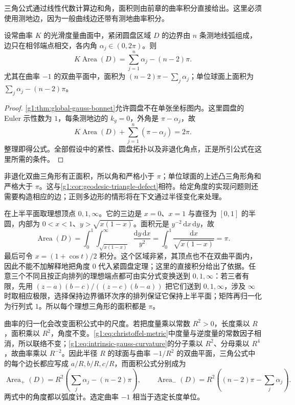 三角公式通过线性代数计算边和角，面积则由前章的曲率积分直接给出。这里必须使用测地边，因为一般曲线边还带有测地曲率积分。

\begin{proposition}
	\label{g1:prop:geodesic-polygon-area}
	设常曲率 \(K\) 的光滑度量曲面中，紧闭圆盘区域 \(D\) 的边界由 \(n\) 条测地线弧组成，边只在相邻端点相交，各内角 \(\alpha_j\in(0,2\pi)\)。则
	\begin{equation}
		\label{g1:eq:constant-curvature-polygon-area}
		K\operatorname{Area}(D)=\sum_{j=1}^n\alpha_j-(n-2)\pi.
	\end{equation}
	尤其在曲率 \(-1\) 的双曲平面中，面积为 \((n-2)\pi-\sum_j\alpha_j\)；单位球面上面积为 \(\sum_j\alpha_j-(n-2)\pi\)。
\end{proposition}
\begin{proof}
	\cref{g1:thm:global-gauss-bonnet}允许圆盘不在单张坐标图内。这里圆盘的 Euler 示性数为 \(1\)，每条测地边的 \(k_g=0\)，外角是 \(\pi-\alpha_j\)，故
	\[
		K\operatorname{Area}(D)+\sum_{j=1}^n(\pi-\alpha_j)=2\pi.
	\]
	整理即得公式。全部假设中的紧性、圆盘拓扑以及非退化角点，正是所引公式在这里所需的条件。
\end{proof}

非退化双曲三角形有正面积，所以角和严格小于 \(\pi\)；单位球面的上述凸三角形角和严格大于 \(\pi\)。这与\cref{g1:cor:geodesic-triangle-defect}相符。给定角度的实现问题则还需要构造相应的边；正则多边形的情形将在下文通过半径变化来处理。

\begin{example}
	\label{g1:exm:ideal-triangle-area}
	在上半平面取理想顶点 \(0,1,\infty\)。它的三边是 \(x=0\)、\(x=1\) 与直径为 \([0,1]\) 的半圆，内部为 \(0<x<1\)、\(y>\sqrt{x(1-x)}\)。面积元是 \(y^{-2}\,\mathrm{d}x\,\mathrm{d}y\)，故
	\[
		\operatorname{Area}(D)
		=\int_0^1\int_{\sqrt{x(1-x)}}^\infty\frac{\mathrm{d}y\,\mathrm{d}x}{y^2}
		=\int_0^1\frac{\mathrm{d}x}{\sqrt{x(1-x)}}=\pi.
	\]
	最后可令 \(x=(1+\cos t)/2\) 积分。这个区域非紧，其顶点也不在双曲平面内，因此不能不加解释地把角度 \(0\) 代入紧圆盘定理；这里的直接积分给出了依据。任意三个不同且按正向排列的理想端点都可由实分式变换送到 \(0,1,\infty\)：若三者有限，先用 \((z-a)(b-c)/((z-c)(b-a))\) 把它们送到 \(0,1,\infty\)，涉及 \(\infty\) 时取相应极限，选择保持边界循环次序的排列保证它保持上半平面；矩阵再归一化为行列式 \(1\)。所以每个理想三角形的面积都是 \(\pi\)。
\end{example}

曲率的归一化会改变面积公式中的尺度。若把度量乘以常数 \(R^2>0\)，长度乘以 \(R\)，面积乘以 \(R^2\)，角度不变。\eqref{g1:eq:christoffel-metric}中度量与逆度量的常数因子相消，所以联络不变；\eqref{g1:eq:intrinsic-gauss-curvature}的分子乘以 \(R^2\)、分母乘以 \(R^4\)，故曲率乘以 \(R^{-2}\)。因此半径 \(R\) 的球面与曲率 \(-1/R^2\) 的双曲平面，三角公式中的每个边长都应写成 \(a/R,b/R,c/R\)，而面积公式分别成为
\[
	\operatorname{Area}_{+}(D)=R^2\left(\sum_j\alpha_j-(n-2)\pi\right),\qquad
	\operatorname{Area}_{-}(D)=R^2\left((n-2)\pi-\sum_j\alpha_j\right).
\]
两式中的角度都以弧度计。选定曲率 \(-1\) 相当于选定长度单位。

